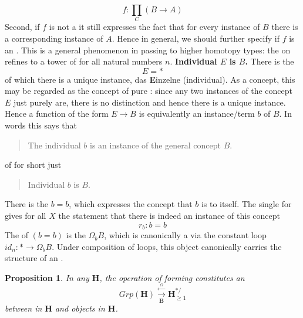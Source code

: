 \documentclass[12pt,titlepage]{article}
\theoremstyle{plain}
\newtheorem{prop}{Proposition}
\theoremstyle{definition}
\theoremstyle{remark}
\begin{document}
\begin{displaymath}
f\colon \underset{C}{\prod} (B \longrightarrow A)
\end{displaymath}
Second, if $f$ is not a  it still expresses the fact that for every instance of $B$ there is a corresponding instance of $A$. Hence in general, we should further specify if $f$ is an . This is a general phenomenon in passing to higher homotopy types: the  on  refines to a tower of  for all natural numbers $n$.
\textbf{Individual $E$ is $B$.}
There is the 
\begin{displaymath}
E = \ast
\end{displaymath}
of which there is a unique instance, das \textbf{E}inzelne (individual). As a concept, this may be regarded as the concept of pure : since any two instances of the concept $E$ just purely are, there is no distinction and hence there is a unique instance.
Hence a function of the form $E \longrightarrow B$ is equivalently an instance/term $b$ of $B$. In words this says that
\begin{quote}%
The individual $b$ is an instance of the general concept $B$.
\end{quote}
of for short just
\begin{quote}%
Individual $b$ is $B$.
\end{quote}
There is the  $b = b$, which expresses the concept that $b$ is  to itself.
The single  for  gives for all $X$ the statement that there is indeed an instance of this concept
\begin{displaymath}
r_b \colon b = b
\end{displaymath}
The  of $(b = b)$ is the  $\Omega_b B$, which is canonically a  via the constant loop $id_n \colon \ast \to \Omega_b B$.
Under composition of loops, this object canonically carries the structure of an .
\begin{prop}
\label{LoopingDeloopingTheorem}\hypertarget{LoopingDeloopingTheorem}{}
In any  $\mathbf{H}$, the operation of forming  constitutes an 
\begin{displaymath}
Grp(\mathbf{H})
\stackrel{\overset{\Omega}{\longleftarrow}}{\underset{\mathbf{B}}{\longrightarrow}}
\mathbf{H}^{\ast/}_{\geq 1}
\end{displaymath}
between  in $\mathbf{H}$ and   objects in $\mathbf{H}$.
\end{prop}
\end{document}
